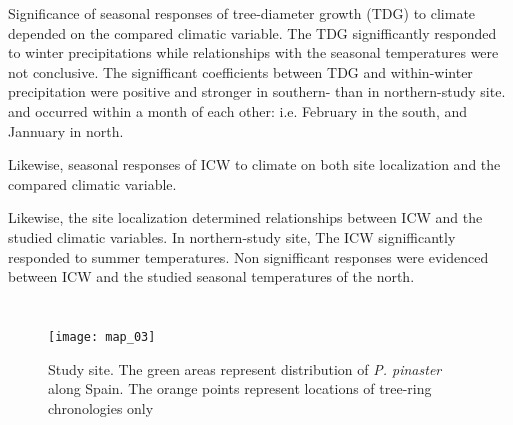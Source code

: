 \documentclass[review,authoryear]{elsarticle}
\begin{document}
Significance of seasonal responses of tree-diameter growth (TDG) to
climate depended on the compared climatic variable. The TDG
signifficantly responded to winter precipitations while relationships
with the seasonal temperatures were not conclusive. The signifficant
coefficients between TDG and within-winter precipitation were positive
and stronger in southern- than in northern-study site. and occurred
within a month of each other: i.e. February in the south, and Jannuary
in north.

Likewise, seasonal responses of ICW to climate on both site
localization and the compared climatic variable.

Likewise, the site localization determined relationships between ICW
and the studied climatic variables. In northern-study site, The ICW
signifficantly responded to summer temperatures. Non signifficant
responses were evidenced between ICW and the studied seasonal
temperatures of the north.






\newpage
\section{\refname}



\clearpage
\begin{figure}\centering
\texttt{[image: map\_03]} 
\caption{Study site. The green areas represent distribution of
  \textit{P. pinaster} along Spain. The orange points represent
  locations of tree-ring chronologies only}
\label{fig:map_03} 
\end{figure}
\end{document}
